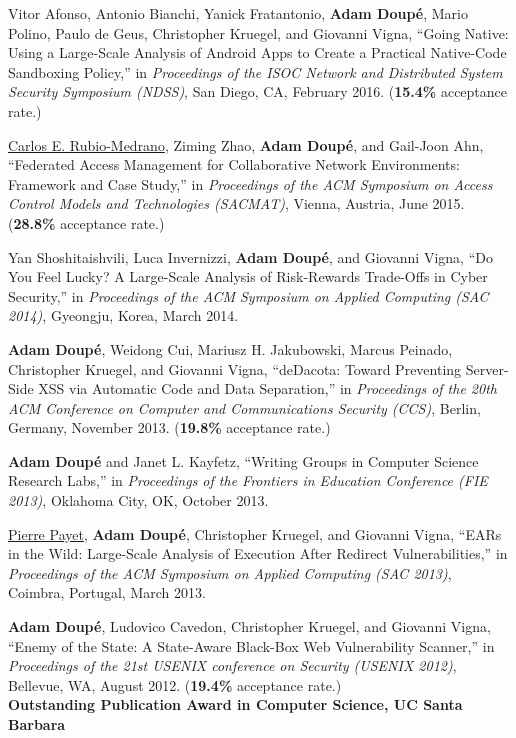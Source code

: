 \documentclass[11pt,letterpaper,sans]{moderncv}
\begin{document}
\begin{etaremune}
\item Vitor Afonso, Antonio Bianchi, Yanick Fratantonio, \textbf{Adam
  Doup\'e}, Mario Polino, Paulo de Geus, Christopher Kruegel, and
  Giovanni Vigna, ``Going Native: Using a Large-Scale Analysis of
  Android Apps to Create a Practical Native-Code Sandboxing Policy,''
  in \emph{Proceedings of the ISOC Network and Distributed System
    Security Symposium (NDSS)}, San Diego, CA, February 2016. (\textbf{15.4\%}
  acceptance rate.)

\item \underline{Carlos E. Rubio-Medrano}, Ziming Zhao, \textbf{Adam
  Doup\'e}, and Gail-Joon Ahn, ``Federated Access Management for
  Collaborative Network Environments: Framework and Case Study,'' in
  \emph{Proceedings of the ACM Symposium on Access Control Models and
    Technologies (SACMAT)}, Vienna, Austria, June 2015. (\textbf{28.8\%}
  acceptance rate.)

\item Yan Shoshitaishvili, Luca Invernizzi, \textbf{Adam Doup\'e}, and
  Giovanni Vigna, ``Do You Feel Lucky? A Large-Scale Analysis of
  Risk-Rewards Trade-Offs in Cyber Security,'' in \emph{Proceedings of
    the ACM Symposium on Applied Computing (SAC 2014)}, Gyeongju,
  Korea, March 2014.

\item \textbf{Adam Doup\'e}, Weidong Cui, Mariusz H. Jakubowski,
  Marcus Peinado, Christopher Kruegel, and Giovanni Vigna, ``deDacota:
  Toward Preventing Server-Side XSS via Automatic Code and Data
  Separation,'' in \emph{Proceedings of the 20th ACM Conference on
    Computer and Communications Security (CCS)}, Berlin, Germany,
  November 2013. (\textbf{19.8\%} acceptance rate.)

\item \textbf{Adam Doup\'e} and Janet L. Kayfetz, ``Writing Groups in
  Computer Science Research Labs,'' in \emph{Proceedings of the
    Frontiers in Education Conference (FIE 2013)}, Oklahoma City, OK,
  October 2013.

\item \underline{Pierre Payet}, \textbf{Adam Doup\'e}, Christopher
  Kruegel, and Giovanni Vigna, ``EARs in the Wild: Large-Scale
  Analysis of Execution After Redirect Vulnerabilities,'' in
  \emph{Proceedings of the ACM Symposium on Applied Computing (SAC
    2013)}, Coimbra, Portugal, March 2013.

\item \textbf{Adam Doup\'e}, Ludovico Cavedon, Christopher Kruegel,
  and Giovanni Vigna, ``Enemy of the State: A State-Aware Black-Box
  Web Vulnerability Scanner,'' in \emph{Proceedings of the 21st USENIX
    conference on Security (USENIX 2012)}, Bellevue, WA, August 2012.
  (\textbf{19.4\%} acceptance rate.) \\
  \textbf{Outstanding Publication Award in Computer
  Science, UC Santa Barbara}


\end{etaremune}
\end{document}
